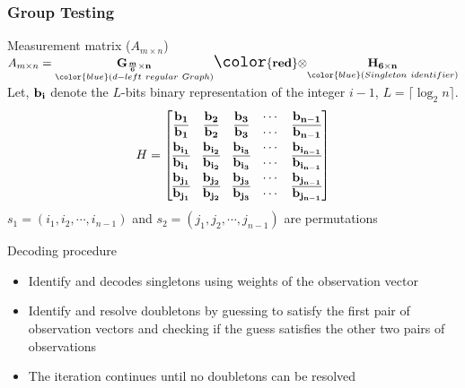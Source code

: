 \begin{frame}\frametitle{Group Testing}
\vspace*{-0.1in}
  \begin{block}{Measurement matrix ($A_{m\times n}$)}
  {\centering
  $A_{m \times n}  = \underset{\color{blue} (d-left \ regular \ Graph)}{\bf G_{\frac{m}{6} \times n}} {\Large \bf \color{red} \otimes} \underset{\color{blue} (Singleton \ identifier)}{\bf H_{6 \times n}}$ \\
  \vspace{6pt}
  Let, $\bf{b_i}$ denote the {\color{blue}$L$-bits binary representation of the integer $i-1$}, $L=\lceil \log_2{n} \rceil$.
   {\small \[ H = \begin{bmatrix}
					\bf{b_1} & \bf{b_2} & \bf{b_3} & \cdots & \bf{b_{n-1}}\\
				   	\bf{\overline{b_1}} & \bf{\overline{b_2}} & \bf{\overline{b_3}} & \cdots & \bf{\overline{b_{n-1}}}\\
					\bf{b_{i_1}} & \bf{b_{i_2}} & \bf{b_{i_3}} & \cdots & \bf{b_{i_{n-1}}}\\
				   	\bf{\overline{b_{i_1}}} & \bf{\overline{b_{i_2}}} & \bf{\overline{b_{i_3}}} & \cdots & \bf{\overline{b_{i_{n-1}}}}\\
				   	
					\bf{b_{j_1}} & \bf{b_{j_2}} & \bf{b_{j_3}} & \cdots & \bf{b_{j_{n-1}}}\\
				   	\bf{\overline{b_{j_1}}} & \bf{\overline{b_{j_2}}} & \bf{\overline{b_{j_3}}} & \cdots & \bf{\overline{b_{j_{n-1}}}} \end{bmatrix} \]
$s_1=(i_1, i_2, \cdots, i_{n-1})$ and $s_2=(j_1, j_2, \cdots, j_{n-1})$ are permutations }}
 \end{block}

\begin{block}{Decoding procedure}
\begin{itemize}
\item  Identify and decodes singletons using weights of the observation vector
\item Identify and resolve doubletons by guessing to satisfy the first pair of observation vectors and checking if the guess satisfies the other two pairs of observations
\item The iteration continues until no doubletons can be resolved
\end{itemize}

\end{block}
\end{frame}

